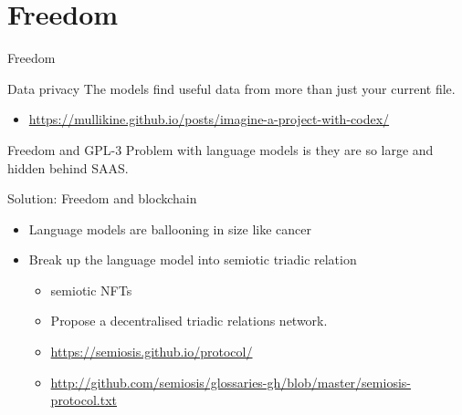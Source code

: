 \documentclass[presentation]{beamer}
\begin{document}
\section{Freedom}
\label{sec:org0f7035c}
\begin{frame}[label={sec:org52ac2d9}]{Freedom}
\begin{block}{Data privacy}
The models find useful data from more than just your current file.
\begin{itemize}
\item \url{https://mullikine.github.io/posts/imagine-a-project-with-codex/}
\end{itemize}
\end{block}

\begin{block}{Freedom and GPL-3}
Problem with language models is they are so large and hidden behind SAAS.
\end{block}

\begin{block}{Solution: Freedom and blockchain}
\begin{itemize}
\item Language models are ballooning in size like cancer
\item Break up the language model into semiotic triadic relation
\begin{itemize}
\item semiotic NFTs
\item Propose a decentralised triadic relations network.
\item \url{https://semiosis.github.io/protocol/}
\item \url{http://github.com/semiosis/glossaries-gh/blob/master/semiosis-protocol.txt}
\end{itemize}
\end{itemize}
\end{block}
\end{frame}
\end{document}
